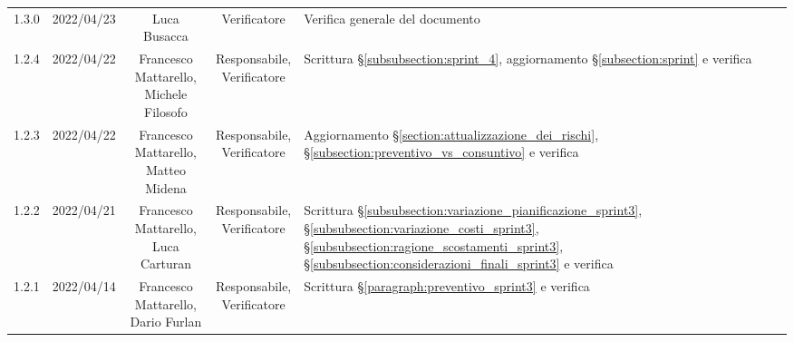\begin{center}
\begin{longtable}[c]{c | c | c | c | p{5cm}}
		1.3.0                                                      & 2022/04/23 & Luca Busacca                           & Verificatore   & Verifica generale del documento                                                                                                           \\
		1.2.4                                                      & 2022/04/22 & \Shortunderstack{Francesco Mattarello,                                                                                                                                                              \\Michele Filosofo} & \Shortunderstack{Responsabile,\\Verificatore} & Scrittura §\ref{subsubsection:sprint_4}, aggiornamento §\ref{subsection:sprint} e verifica\\
		1.2.3                                                      & 2022/04/22 & \Shortunderstack{Francesco Mattarello,                                                                                                                                                              \\Matteo Midena} & \Shortunderstack{Responsabile,\\Verificatore} & Aggiornamento §\ref{section:attualizzazione_dei_rischi}, §\ref{subsection:preventivo_vs_consuntivo} e verifica\\
		1.2.2                                                      & 2022/04/21 & \Shortunderstack{Francesco Mattarello,                                                                                                                                                              \\Luca Carturan} & \Shortunderstack{Responsabile,\\Verificatore} & Scrittura §\ref{subsubsection:variazione_pianificazione_sprint3}, §\ref{subsubsection:variazione_costi_sprint3}, §\ref{subsubsection:ragione_scostamenti_sprint3}, §\ref{subsubsection:considerazioni_finali_sprint3} e verifica\\
		1.2.1                                                      & 2022/04/14 & \Shortunderstack{Francesco Mattarello,                                                                                                                                                              \\Dario Furlan} & \Shortunderstack{Responsabile,\\Verificatore} & Scrittura §\ref{paragraph:preventivo_sprint3} e verifica\\

\end{longtable}
\end{center}
